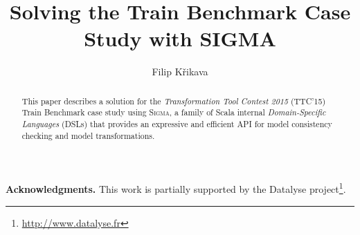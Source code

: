 \documentclass[submission]{eptcs}
\title{Solving the \TTC Train Benchmark Case Study with SIGMA}
\author{
  Filip Křikava
  \institute{Faculty of Information Technologies}
  \institute{Czech Technical University, Czech Republic}
  \email{\href{mailto:filip.krikava@fit.cvut.cz}{filip.krikava@fit.cvut.cz}}
}
\newcommand{\SIGMA}{\textsc{Sigma}\xspace}
\newcommand{\TTC}{TTC'15\xspace}
\newcommand{\Paragraph}[1]{\vspace*{2mm} \noindent \textbf{#1.}}
\begin{document}
\maketitle

\begin{abstract}
This paper describes a solution for the \emph{Transformation Tool Contest 2015} (\TTC) Train Benchmark case study using \SIGMA, a family of Scala internal \emph{Domain-Specific Languages} (DSLs) that provides an expressive and efficient API for model consistency checking and model transformations.
\end{abstract}






\Paragraph{Acknowledgments}
This work is partially supported by the Datalyse project\footnote{\url{http://www.datalyse.fr}}.


	

\clearpage
\appendix


\end{document}
